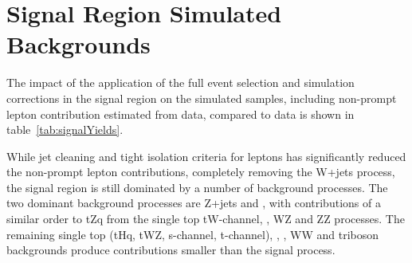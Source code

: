 \section{Signal Region Simulated Backgrounds}\label{sec:simBackgrounds}
The impact of the application of the full event selection and simulation corrections in the signal region on the simulated samples, including non-prompt lepton contribution estimated from data, compared to data is shown in table~\ref{tab:signalYields}.

While jet cleaning and tight isolation criteria for leptons has significantly reduced the non-prompt lepton contributions, completely removing the W+jets process, the signal region is still dominated by a number of background processes.
The two dominant background processes are Z+jets and \ttbar, with contributions of a similar order to tZq from the single top tW-channel, \ttbarZ, WZ and ZZ processes.
The remaining single top (tHq, tWZ, s-channel, t-channel), \ttbarW, \ttbarH, WW and triboson backgrounds produce contributions smaller than the signal process.

